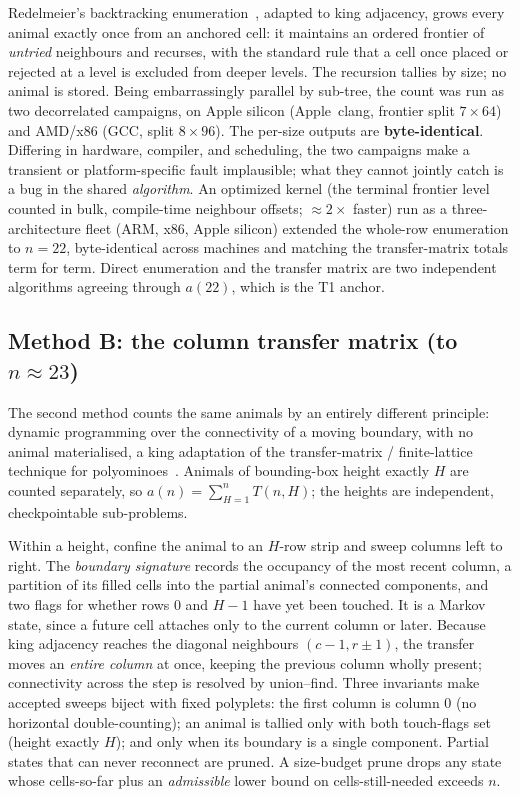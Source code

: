 \documentclass[11pt]{article}
\newcommand{\tierone}{\textsf{T1}}
\begin{document}
Redelmeier's backtracking enumeration~\cite{redelmeier}, adapted to king
adjacency, grows every animal exactly once from an anchored cell: it maintains
an ordered frontier of \emph{untried} neighbours and recurses, with the
standard rule that a cell once placed or rejected at a level is excluded from
deeper levels. The recursion tallies by size; no animal is stored. Being
embarrassingly parallel by sub-tree, the count was run as two decorrelated
campaigns, on Apple silicon (Apple~clang, frontier split $7\times64$) and
AMD/x86 (GCC, split $8\times96$). The per-size outputs are
\textbf{byte-identical}. Differing in hardware, compiler, and scheduling,
the two campaigns make a transient or platform-specific fault implausible;
what they cannot jointly catch is a bug in the shared \emph{algorithm}.
An optimized kernel (the terminal frontier level counted in
bulk, compile-time neighbour offsets; ${\approx}2\times$ faster) run as a
three-architecture fleet (ARM, x86, Apple silicon) extended the whole-row
enumeration to $n=22$, byte-identical across machines and matching the
transfer-matrix totals term for term. Direct enumeration and the transfer
matrix are two independent algorithms agreeing through $a(22)$, which
is the \tierone{} anchor.

\subsection{Method B: the column transfer matrix (to $n\approx23$)}
\label{sec:methodB}

The second method counts the same animals by an entirely different principle:
dynamic programming over the connectivity of a moving boundary, with no animal
materialised, a king adaptation of the transfer-matrix / finite-lattice
technique for polyominoes~\cite{jensen2001,jensen2003,bousquet}. Animals of
bounding-box height exactly $H$ are counted separately, so
$a(n)=\sum_{H=1}^{n}T(n,H)$; the heights are independent, checkpointable
sub-problems.

Within a height, confine the animal to an $H$-row strip and sweep columns left
to right. The \emph{boundary signature} records the occupancy of the most
recent column, a partition of its filled cells into the partial animal's
connected components, and two flags for whether rows $0$ and $H-1$ have yet
been touched. It is a Markov state, since a future cell attaches only to the
current column or later. Because king adjacency reaches the diagonal neighbours
$(c{-}1,r{\pm}1)$, the transfer moves an \emph{entire column} at once, keeping
the previous column wholly present; connectivity across the step is resolved
by union--find. Three invariants make accepted sweeps biject with fixed
polyplets: the first column is column $0$ (no horizontal double-counting); an
animal is tallied only with both touch-flags set (height exactly $H$); and
only when its boundary is a single component. Partial states that can never
reconnect are pruned. A size-budget prune drops any state whose cells-so-far
plus an \emph{admissible} lower bound on cells-still-needed exceeds $n$.
\end{document}
